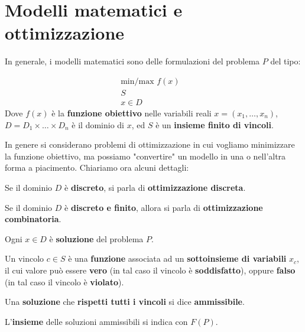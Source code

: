 \section{Modelli matematici e ottimizzazione}

In generale, i modelli matematici sono delle formulazioni del problema $P$ del tipo:

\begin{definition}
    \[
        \begin{aligned}
            \text{min/max }f(x)& \\ 
            S& \\ 
            x\in D&
        \end{aligned}
    \]
    Dove $f(x)$ è la \textbf{funzione obiettivo} nelle variabili reali $x=(x_{1},\ldots,x_n)$,
    $D=D_{1}\times \ldots \times D_n$ è il dominio di $x$, ed $S$ è un 
    \textbf{insieme finito di vincoli}.
\end{definition}

In genere si considerano problemi di ottimizzazione in cui vogliamo minimizzare la funzione
obiettivo, ma possiamo "convertire" un modello in una o nell'altra forma a piacimento.
Chiariamo ora alcuni dettagli:

\begin{definition}
    Se il dominio $D$ è \textbf{discreto}, si parla di \textbf{ottimizzazione discreta}.
\end{definition}

\begin{definition}
    Se il dominio $D$ è \textbf{discreto e finito}, allora si parla di
    \textbf{ottimizzazione combinatoria}.
\end{definition}

\begin{definition}[SOLUZIONE]
    Ogni $x\in D$ è \textbf{soluzione} del problema $P$.
\end{definition}

\begin{definition}[VINCOLO]
    Un vincolo $c\in S$ è una \textbf{funzione} associata ad un
    \textbf{sottoinsieme di variabili} $x_c$, il cui valore può essere
    \textbf{vero} (in tal caso il vincolo è \textbf{soddisfatto}), oppure
    \textbf{falso} (in tal caso il vincolo è \textbf{violato}).
\end{definition}

\begin{definition}
    Una \textbf{soluzione} che \textbf{rispetti tutti i vincoli} si 
    dice \textbf{ammissibile}.

    L'\textbf{insieme} delle soluzioni ammissibili si indica con $F(P)$.
\end{definition}

